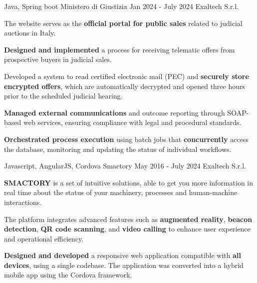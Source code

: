 \begin{cventries}
  \cventry
    {Java, Spring boot} %
    {Ministero di Giustizia} %
    {Jan 2024 - July 2024} %
    {Exaltech S.r.l.} %
    {
      \begin{cvitems} %
        \item {The website serves as the \textbf{official portal for public sales} related to judicial auctions in Italy.}
        \item {\textbf{Designed and implemented} a process for receiving telematic offers from prospective buyers in judicial sales.}
        \item {Developed a system to read certified electronic mail (PEC) and \textbf{securely store encrypted offers}, which are automatically decrypted and opened three hours prior to the scheduled judicial hearing.}  
        \item {\textbf{Managed external communications} and outcome reporting through SOAP-based web services, ensuring compliance with legal and procedural standards.}  
        \item {\textbf{Orchestrated process execution} using batch jobs that \textbf{concurrently} access the database, monitoring and updating the status of individual workflows.}  
      \end{cvitems}
    }

  \cventry
    {Javascript, AngularJS, Cordova} %
    {Smactory} %
    {May 2016 - July 2024} %
    {Exaltech S.r.l.} %
    {
      \begin{cvitems} %
        \item {\textbf{SMACTORY} is a set of intuitive solutions, able to get you more information in real time about the status of your machinery, processes and human-machine interactions.}
        \item {The platform integrates advanced features such as \textbf{augmented reality}, \textbf{beacon detection}, \textbf{QR code scanning}, and \textbf{video calling} to enhance user experience and operational efficiency.}  
        \item {\textbf{Designed and developed} a responsive web application compatible with \textbf{all devices}, using a single codebase. The application was converted into a hybrid mobile app using the Cordova framework.}  
      \end{cvitems}
    }
\end{cventries}

